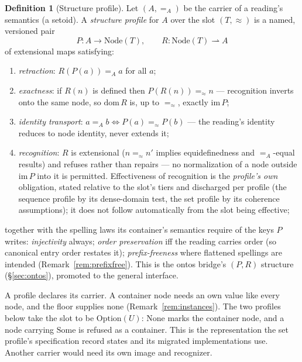 \documentclass[11pt]{article}
\theoremstyle{definition}
\newtheorem{definition}[theorem]{Definition}
\newcommand{\NodeT}[1]{\mathrm{Node}(#1)}
\newcommand{\eqS}{=_{\approx}}                     %
\begin{document}
\begin{definition}[Structure profile]\label{def:profile}
Let $(A, =_A)$ be the carrier of a reading's semantics (a setoid). A
\emph{structure profile} for $A$ over the slot $(T, \approx)$ is a named, versioned
pair
\[
P : A \to \NodeT{T}, \qquad R : \NodeT{T} \rightharpoonup A
\]
of extensional maps satisfying:
\begin{enumerate}[label=(\roman*), leftmargin=2.2em]
\item \emph{retraction}: $R(P(a)) =_A a$ for all $a$;
\item \emph{exactness}: if $R(n)$ is defined then $P(R(n)) \eqS n$ --- recognition
  inverts onto the same node, so $\mathrm{dom}\,R$ is, up to $\eqS$, exactly
  $\mathrm{im}\,P$;
\item \emph{identity transport}: $a =_A b \iff P(a) \eqS P(b)$ --- the reading's
  identity reduces to node identity, never extends it;
\item \emph{recognition}: $R$ is extensional ($n \eqS n'$ implies equidefinedness and
  $=_A$-equal results) and refuses rather than repairs --- no normalization of a node
  outside $\mathrm{im}\,P$ into it is permitted. Effectiveness of recognition is the
  \emph{profile's own} obligation, stated relative to the slot's tiers and discharged
  per profile (the sequence profile by its dense-domain test, the set profile by its
  coherence assumptions); it does not follow automatically from the slot being
  effective;
\end{enumerate}
together with the spelling laws its container's semantics require of the keys $P$
writes: \emph{injectivity} always; \emph{order preservation} iff the reading carries
order (so canonical entry order restates it); \emph{prefix-freeness} where flattened
spellings are intended (Remark~\ref{rem:prefixfree}). This is the ontos bridge's
$(P, R)$ structure (\S\ref{sec:ontos}), promoted to the general interface.
\end{definition}

A profile declares its carrier. A container node needs an own value like every node,
and the floor supplies none (Remark~\ref{rem:instances}). The two profiles below take
the slot to be $\mathrm{Option}(U)$: $\mathrm{None}$ marks the container node, and a node
carrying $\mathrm{Some}$ is refused as a container. This is the representation the set
profile's specification record states and its migrated implementations use.
Another carrier would need its own image and recognizer.
\end{document}
